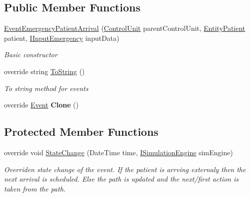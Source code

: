 \subsection*{Public Member Functions}
\begin{DoxyCompactItemize}
\item 
\hyperlink{class_general_health_care_elements_1_1_department_models_1_1_emergency_1_1_event_emergency_patient_arrival_a6212793b07f4fbef095fad91c62acd27}{Event\+Emergency\+Patient\+Arrival} (\hyperlink{class_simulation_core_1_1_h_c_c_m_elements_1_1_control_unit}{Control\+Unit} parent\+Control\+Unit, \hyperlink{class_general_health_care_elements_1_1_entities_1_1_entity_patient}{Entity\+Patient} patient, \hyperlink{interface_general_health_care_elements_1_1_department_models_1_1_emergency_1_1_i_input_emergency}{I\+Input\+Emergency} input\+Data)
\begin{DoxyCompactList}\small\item\em Basic constructor \end{DoxyCompactList}\item 
override string \hyperlink{class_general_health_care_elements_1_1_department_models_1_1_emergency_1_1_event_emergency_patient_arrival_adc54538f08106162d8db93d18860737e}{To\+String} ()
\begin{DoxyCompactList}\small\item\em To string method for events \end{DoxyCompactList}\item 
override \hyperlink{class_simulation_core_1_1_h_c_c_m_elements_1_1_event}{Event} {\bfseries Clone} ()\hypertarget{class_general_health_care_elements_1_1_department_models_1_1_emergency_1_1_event_emergency_patient_arrival_aa64378e782f2aeb734b09c7b0483c371}{}\label{class_general_health_care_elements_1_1_department_models_1_1_emergency_1_1_event_emergency_patient_arrival_aa64378e782f2aeb734b09c7b0483c371}

\end{DoxyCompactItemize}
\subsection*{Protected Member Functions}
\begin{DoxyCompactItemize}
\item 
override void \hyperlink{class_general_health_care_elements_1_1_department_models_1_1_emergency_1_1_event_emergency_patient_arrival_aed4d2c00f77aabfd24880d44c004450e}{State\+Change} (Date\+Time time, \hyperlink{interface_simulation_core_1_1_simulation_classes_1_1_i_simulation_engine}{I\+Simulation\+Engine} sim\+Engine)
\begin{DoxyCompactList}\small\item\em Overriden state change of the event. If the patient is arrving externaly then the next arrival is scheduled. Else the path is updated and the next/first action is taken from the path. \end{DoxyCompactList}\end{DoxyCompactItemize}
